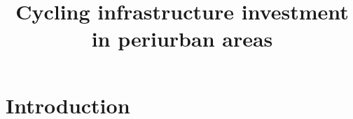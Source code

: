 \documentclass{article}
\title{Cycling infrastructure investment in periurban areas}
\author{}
\date{}
\begin{document}
\maketitle

\section{Introduction}
\end{document}
